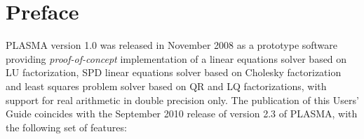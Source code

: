 
\chapter*{Preface}

PLASMA version 1.0 was released in November 2008 as a prototype software providing
\mbox{\em proof-of-concept} implementation of a linear equations solver based on LU factorization,
SPD linear equations solver based on Cholesky factorization and least squares problem solver based
on QR and LQ factorizations, with support for real arithmetic in double precision only.
The publication of this Users' Guide coincides with the September 2010 release of version 2.3 of
PLASMA, with the following set of features:

